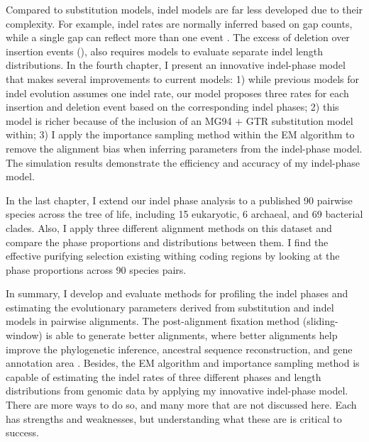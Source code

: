 Compared to substitution models, indel models are far less developed due to their complexity. For example, indel rates are normally inferred based on gap counts, while a single gap can reflect more than one event \parencite{miklos2004long}. The excess of deletion over insertion events (\cite{ophir1997patterns, zhang2003patterns, gu1995size}), also requires models to evaluate separate indel length distributions. In the fourth chapter, I present an innovative indel-phase model that makes several improvements to current models: 1) while previous models for indel evolution assumes one indel rate, our model proposes three rates for each insertion and deletion event based on the corresponding indel phases; 2) this model is richer because of the inclusion of an MG94 + GTR substitution model within; 3) I apply the importance sampling method within the EM algorithm to remove the alignment bias when inferring parameters from the indel-phase model. The simulation results demonstrate the efficiency and accuracy of my indel-phase model. 

 In the last chapter, I extend our indel phase analysis to a published 90 pairwise species across the tree of life, including 15 eukaryotic, 6 archaeal, and 69 bacterial clades. Also, I apply three different alignment methods on this dataset and compare the phase proportions and distributions between them. I find the effective purifying selection existing withing coding regions by looking at the phase proportions across 90 species pairs.  

In summary, I develop and evaluate methods for profiling the indel phases and estimating the evolutionary parameters derived from substitution and indel models in pairwise alignments. The post-alignment fixation method (sliding-window) is able to generate better alignments, where better alignments help improve the phylogenetic inference, ancestral sequence reconstruction, and gene annotation area \parencite{rosenberg2009sequence}. Besides, the EM algorithm and importance sampling method is capable of estimating the indel rates of three different phases and length distributions from genomic data by applying my innovative indel-phase model. There are more ways to do so, and many more that are not discussed here. Each has strengths and weaknesses, but understanding what these are is critical to success. 

